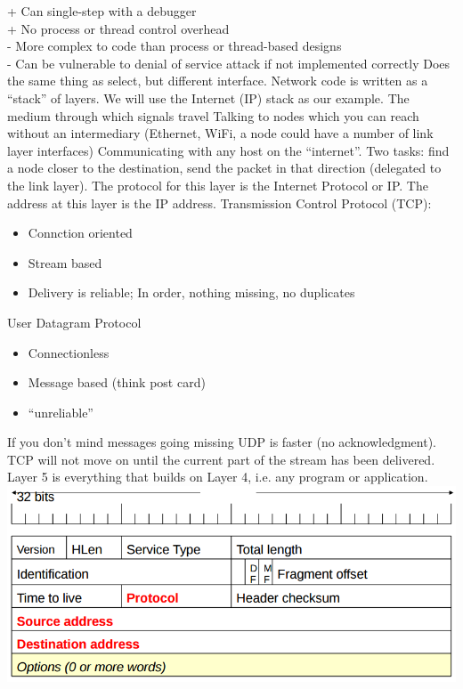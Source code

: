 \documentclass[number]{notes}
\begin{document}
\begin{landscape}
\begin{multicols}{3}
+ Can single-step with a debugger\\
+ No process or thread control overhead\\
- More complex to code than process or thread-based designs\\
- Can be vulnerable to denial of service attack if not implemented correctly
Does the same thing as select, but different interface.
Network code is written as a ``stack'' of layers. We will use the Internet (IP) stack as our example.
The medium through which signals travel
Talking to nodes which you can reach without an intermediary (Ethernet, WiFi, a node could have a number of link layer interfaces)
Communicating with any host on the ``internet''. Two tasks: find a node closer to the destination, send the packet in that direction (delegated to the link layer). The protocol for this layer is the Internet Protocol or IP. The address at this layer is the IP address.
Transmission Control Protocol (TCP):
\begin{itemize}[nolistsep]
    \item Connction oriented
    \item Stream based
    \item Delivery is reliable; In order, nothing missing, no duplicates
\end{itemize}
User Datagram Protocol
\begin{itemize}[nolistsep]
    \item Connectionless
    \item Message based (think post card)
    \item ``unreliable''
\end{itemize}
If you don't mind messages going missing UDP is faster (no acknowledgment). TCP will not move on until the current part of the stream has been delivered.
Layer 5 is everything that builds on Layer 4, i.e. any program or application.
\includegraphics[width=\linewidth]{header.png}

\end{multicols}
\end{landscape}
\end{document}
